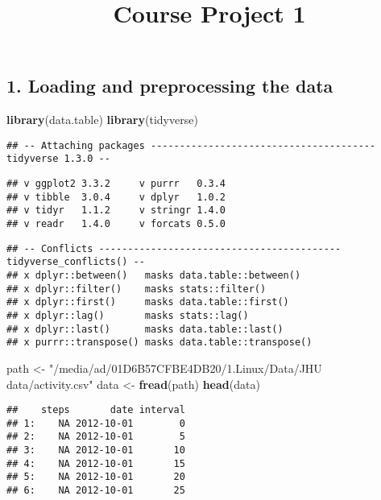 \documentclass[
]{article}
\title{Course Project 1}
\author{}
\date{\vspace{-2.5em}}
\newenvironment{Shaded}{\begin{snugshade}}{\end{snugshade}}
\newcommand{\KeywordTok}[1]{\textcolor[rgb]{0.13,0.29,0.53}{\textbf{#1}}}
\newcommand{\NormalTok}[1]{#1}
\newcommand{\StringTok}[1]{\textcolor[rgb]{0.31,0.60,0.02}{#1}}
\begin{document}
\maketitle

\hypertarget{loading-and-preprocessing-the-data}{%
\subsection{1. Loading and preprocessing the
data}\label{loading-and-preprocessing-the-data}}

\begin{Shaded}
\begin{Highlighting}[]
\KeywordTok{library}\NormalTok{(data.table)}
\KeywordTok{library}\NormalTok{(tidyverse)}
\end{Highlighting}
\end{Shaded}

\begin{verbatim}
## -- Attaching packages --------------------------------------- tidyverse 1.3.0 --
\end{verbatim}

\begin{verbatim}
## v ggplot2 3.3.2     v purrr   0.3.4
## v tibble  3.0.4     v dplyr   1.0.2
## v tidyr   1.1.2     v stringr 1.4.0
## v readr   1.4.0     v forcats 0.5.0
\end{verbatim}

\begin{verbatim}
## -- Conflicts ------------------------------------------ tidyverse_conflicts() --
## x dplyr::between()   masks data.table::between()
## x dplyr::filter()    masks stats::filter()
## x dplyr::first()     masks data.table::first()
## x dplyr::lag()       masks stats::lag()
## x dplyr::last()      masks data.table::last()
## x purrr::transpose() masks data.table::transpose()
\end{verbatim}

\begin{Shaded}
\begin{Highlighting}[]
\NormalTok{path <-}\StringTok{ "/media/ad/01D6B57CFBE4DB20/1.Linux/Data/JHU data/activity.csv"}
\NormalTok{data <-}\StringTok{ }\KeywordTok{fread}\NormalTok{(path)}
\KeywordTok{head}\NormalTok{(data)}
\end{Highlighting}
\end{Shaded}

\begin{verbatim}
##    steps       date interval
## 1:    NA 2012-10-01        0
## 2:    NA 2012-10-01        5
## 3:    NA 2012-10-01       10
## 4:    NA 2012-10-01       15
## 5:    NA 2012-10-01       20
## 6:    NA 2012-10-01       25
\end{verbatim}
\end{document}
